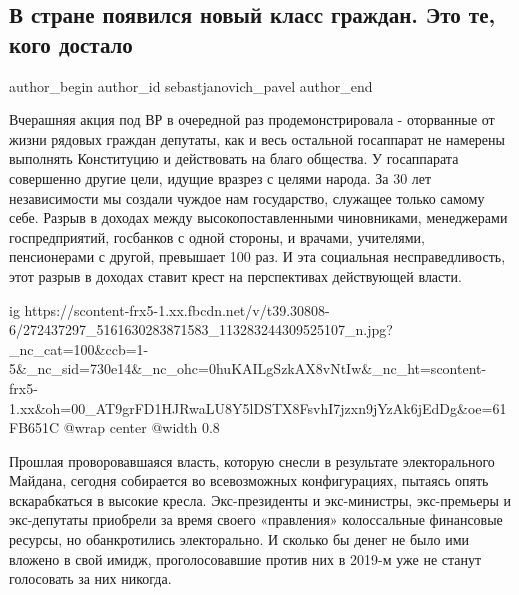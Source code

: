  
 
 
 
 
 
\subsection{В стране появился новый класс граждан. Это те, кого достало}
\label{sec:26_01_2022.fb.sebastjanovich_pavel.1.kogo_dostalo}
 
\ifcmt
 author_begin
   author_id sebastjanovich_pavel
 author_end
\fi

Вчерашняя акция под ВР в очередной раз продемонстрировала - оторванные от жизни
рядовых граждан депутаты, как и весь остальной госаппарат не намерены выполнять
Конституцию и действовать на благо общества. У госаппарата совершенно другие
цели, идущие вразрез с целями народа. За 30 лет независимости мы создали чуждое
нам государство, служащее только самому себе. Разрыв в доходах между
высокопоставленными чиновниками, менеджерами госпредприятий, госбанков с одной
стороны, и врачами, учителями, пенсионерами с другой, превышает 100 раз. И эта
социальная несправедливость, этот разрыв в доходах ставит крест на перспективах
действующей власти.

\ifcmt
  ig https://scontent-frx5-1.xx.fbcdn.net/v/t39.30808-6/272437297_5161630283871583_113283244309525107_n.jpg?_nc_cat=100&ccb=1-5&_nc_sid=730e14&_nc_ohc=0huKAILgSzkAX8vNtIw&_nc_ht=scontent-frx5-1.xx&oh=00_AT9grFD1HJRwaLU8Y5lDSTX8FsvhI7jzxn9jYzAk6jEdDg&oe=61FB651C
	@wrap center
	@width 0.8
\fi

Прошлая проворовавшаяся власть, которую снесли в результате электорального
Майдана,  сегодня собирается во всевозможных конфигурациях, пытаясь опять
вскарабкаться  в высокие кресла. Экс-президенты и экс-министры, экс-премьеры и
экс-депутаты приобрели за время своего «правления» колоссальные финансовые
ресурсы, но обанкротились электорально. И сколько бы денег не было ими вложено
в свой имидж, проголосовавшие против них в 2019-м уже не станут голосовать за
них никогда.

